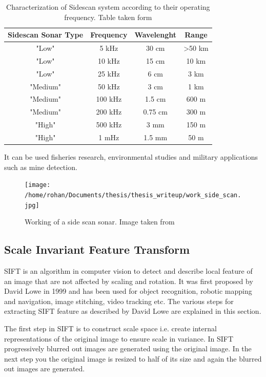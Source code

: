 \documentclass[12pt]{dalcsthesis}
\begin{document}
\begin{table}
\centering
\begin{tabular}{|c|c|c|c|}
\hline 
Sidescan Sonar Type & Frequency & Wavelenght & Range \\ 
\hline 
"Low" & 5 kHz & 30 cm & >50 km \\ 
\hline 
"Low" & 10 kHz & 15 cm & 10 km \\ 
\hline 
"Low" & 25 kHz & 6 cm & 3 km \\ 
\hline 
"Medium" & 50 kHz & 3 cm & 1 km \\ 
\hline 
"Medium" & 100 kHz & 1.5 cm & 600 m \\ 
\hline 
"Medium" & 200 kHz & 0.75 cm & 300 m \\ 
\hline 
"High" & 500 kHz & 3 mm & 150 m \\ 
\hline 
"High" & 1 mHz & 1.5 mm & 50 m \\ 
\hline 
\end{tabular} 
\caption{\label{tab-: classification of side scan} Characterization of Sidescan system according to their operating frequency. Table taken form \cite{side_sonar_usgs_url}} 
\end{table}
It can be used fisheries research, environmental studies and military applications such as mine detection. 

\begin{figure}
  \centering
     {\texttt{[image: /home/rohan/Documents/thesis/thesis\_writeup/work\_side\_scan.jpg]}}
  \caption{\label{fig- side scan sonar working} Working of a side scan sonar. Image taken from \cite{side_sonar_url}}
\end{figure}

\subsection{Scale Invariant Feature Transform}
SIFT is an algorithm in computer vision to detect and describe local feature of an image that are not affected by scaling and rotation. It was first proposed by David Lowe in 1999 \cite{lowe1999object} and has been used for object recognition, robotic mapping and navigation, image stitching, video tracking etc. The various steps for extracting SIFT feature as described by David Lowe are explained in this section.

The first step in SIFT is to construct scale space i.e. create internal representations of the original image to ensure scale in variance. In SIFT progressively blurred out images are generated using the original image. In the next step you the original image is resized to half of its size and again the blurred out images are generated. 
\end{document}
